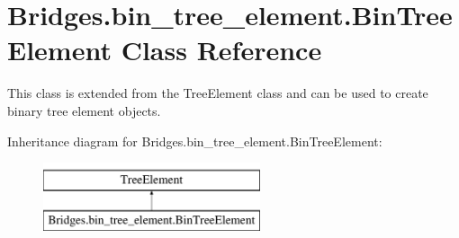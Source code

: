 \hypertarget{class_bridges_1_1bin__tree__element_1_1_bin_tree_element}{}\section{Bridges.\+bin\+\_\+tree\+\_\+element.\+Bin\+Tree\+Element Class Reference}
\label{class_bridges_1_1bin__tree__element_1_1_bin_tree_element}


This class is extended from the Tree\+Element class and can be used to create binary tree element objects.  


Inheritance diagram for Bridges.\+bin\+\_\+tree\+\_\+element.\+Bin\+Tree\+Element\+:\begin{figure}[H]
\begin{center}
\leavevmode
\includegraphics[height=2.000000cm]{class_bridges_1_1bin__tree__element_1_1_bin_tree_element}
\end{center}
\end{figure}
